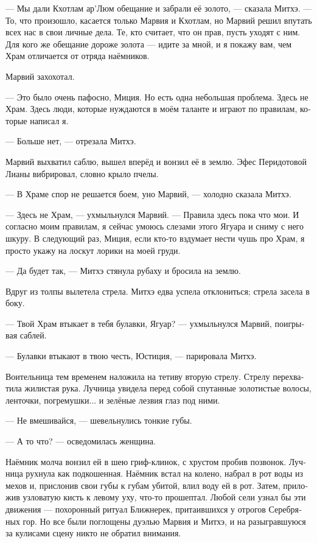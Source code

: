\documentclass[a4paper,12pt,fleqn]{book}\usepackage{cooltooltips}\usepackage{polyglossia}\setdefaultlanguage[babelshorthands=true]{russian}\setotherlanguage{english}\defaultfontfeatures{Ligatures=TeX,Mapping=tex-text} \usepackage{xcolor}\definecolor{lightgray}{HTML}{bbbbbb}\color{lightgray}\newcommand{\ml}[3]{\textenglish{\textcolor{black}{#3}} }
\newcommand{\asterism}{\vspace{1em}{\centering\Large\bfseries$\ast~\ast~\ast$\par}\vspace{1em}}
\begin{document}
--- Мы дали Кхотлам ар'Люм обещание и забрали её золото, --- сказала Митхэ.
--- То, что произошло, касается только Марвия и Кхотлам, но Марвий решил впутать всех нас в свои личные дела.
Те, кто считает, что он прав, пусть уходят с ним.
Для кого же обещание дороже золота --- идите за мной, и я покажу вам, чем Храм отличается от отряда наёмников.

Марвий захохотал.

--- Это было очень пафосно, Миция.
Но есть одна небольшая проблема.
Здесь не Храм.
Здесь люди, которые нуждаются в моём таланте и играют по правилам, которые написал я.

--- Больше нет, --- отрезала Митхэ.

Марвий выхватил саблю, вышел вперёд и вонзил её в землю.
Эфес Перидотовой Лианы вибрировал, словно крыло пчелы.

--- В Храме спор не решается боем, уно Марвий, --- холодно сказала Митхэ.

--- Здесь не Храм, --- ухмыльнулся Марвий.
--- Правила здесь пока что мои.
И согласно моим правилам, я сейчас умоюсь слезами этого Ягуара и сниму с него шкуру.
В следующий раз, Миция, если кто-то вздумает нести чушь про Храм, я просто укажу на лоскут лорики на моей груди.

--- Да будет так, --- Митхэ стянула рубаху и бросила на землю.

\asterism

Вдруг из толпы вылетела стрела.
Митхэ едва успела отклониться;
стрела засела в боку.

--- Твой Храм втыкает в тебя булавки, Ягуар? --- ухмыльнулся Марвий, поигрывая саблей.

--- Булавки втыкают в твою честь, Юстиция, --- парировала Митхэ.

Воительница тем временем наложила на тетиву вторую стрелу.
Стрелу перехватила жилистая рука.
Лучница увидела перед собой спутанные золотистые волосы, ленточки, погремушки... и зелёные лезвия глаз под ними.

--- Не вмешивайся, --- шевельнулись тонкие губы.

--- А то что? --- осведомилась женщина.

Наёмник молча вонзил ей в шею гриф-клинок, с хрустом пробив позвонок.
Лучница рухнула как подкошенная.
Наёмник встал на колено, набрал в рот воды из мехов и, прислонив свои губы к губам убитой, влил воду ей в рот.
Затем, приложив узловатую кисть к левому уху, что-то прошептал.
Любой сели узнал бы эти движения --- похоронный ритуал Ближнерек, притаившихся у отрогов Серебряных гор.
Но все были поглощены дуэлью Марвия и Митхэ, и на разыгравшуюся за кулисами сцену никто не обратил внимания.
\end{document}
